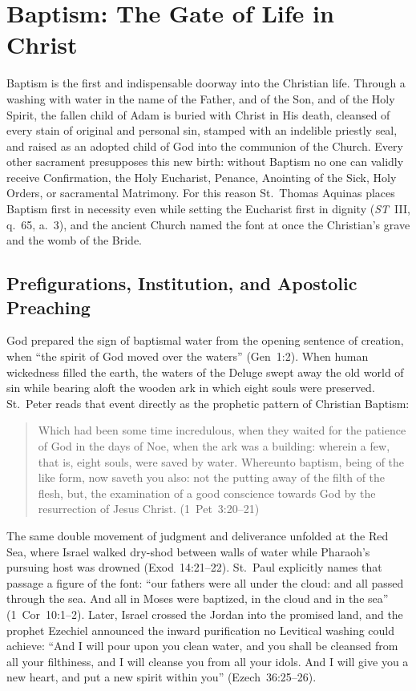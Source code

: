 \section{Baptism: The Gate of Life in Christ}
\label{sec:baptism}

Baptism is the first and indispensable doorway into the Christian life. Through a washing with water in the name of the Father, and of the Son, and of the Holy Spirit, the fallen child of Adam is buried with Christ in His death, cleansed of every stain of original and personal sin, stamped with an indelible priestly seal, and raised as an adopted child of God into the communion of the Church. Every other sacrament presupposes this new birth: without Baptism no one can validly receive Confirmation, the Holy Eucharist, Penance, Anointing of the Sick, Holy Orders, or sacramental Matrimony. For this reason St.~Thomas Aquinas places Baptism first in necessity even while setting the Eucharist first in dignity (\emph{ST}~III, q.~65, a.~3), and the ancient Church named the font at once the Christian's grave and the womb of the Bride.

\subsection{Prefigurations, Institution, and Apostolic Preaching}
\label{subsec:baptism-scripture}

God prepared the sign of baptismal water from the opening sentence of creation, when ``the spirit of God moved over the waters'' (Gen~1:2). When human wickedness filled the earth, the waters of the Deluge swept away the old world of sin while bearing aloft the wooden ark in which eight souls were preserved. St.~Peter reads that event directly as the prophetic pattern of Christian Baptism:
\begin{quotation}
Which had been some time incredulous, when they waited for the patience of God in the days of Noe, when the ark was a building: wherein a few, that is, eight souls, were saved by water. Whereunto baptism, being of the like form, now saveth you also: not the putting away of the filth of the flesh, but, the examination of a good conscience towards God by the resurrection of Jesus Christ. (1~Pet~3:20--21)
\end{quotation}
The same double movement of judgment and deliverance unfolded at the Red Sea, where Israel walked dry-shod between walls of water while Pharaoh's pursuing host was drowned (Exod~14:21--22). St.~Paul explicitly names that passage a figure of the font: ``our fathers were all under the cloud: and all passed through the sea. And all in Moses were baptized, in the cloud and in the sea'' (1~Cor~10:1--2). Later, Israel crossed the Jordan into the promised land, and the prophet Ezechiel announced the inward purification no Levitical washing could achieve: ``And I will pour upon you clean water, and you shall be cleansed from all your filthiness, and I will cleanse you from all your idols. And I will give you a new heart, and put a new spirit within you'' (Ezech~36:25--26).

